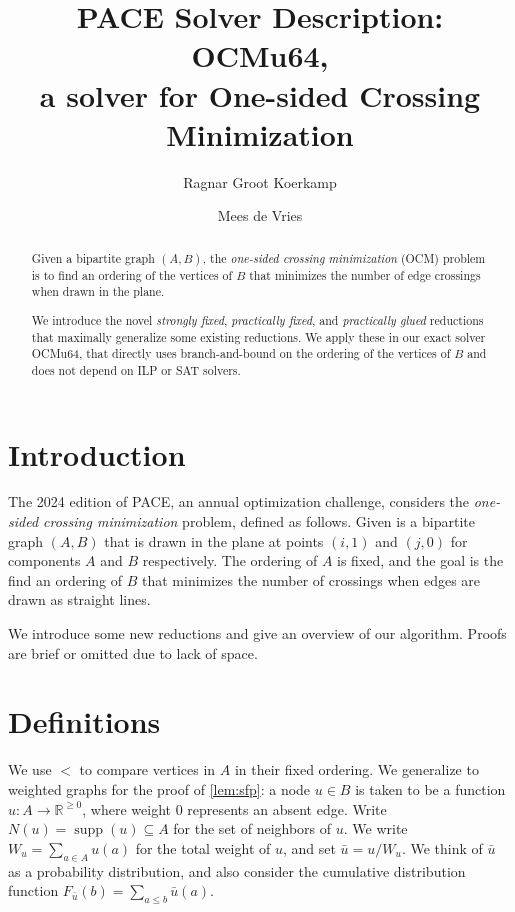 \documentclass[a4paper,UKenglish,cleveref, autoref, thm-restate]{lipics-v2021}
\title{PACE Solver Description: OCMu64,\\ a solver for One-sided Crossing Minimization} %
\author{Ragnar {Groot Koerkamp}}{ETH Zurich, Switzerland}{ragnar.grootkoerkamp@gmail.com}{https://orcid.org/0000-0002-2091-1237}{}%
\author{Mees de Vries}{Unaffiliated, The Netherlands}{meesdevries@protonmail.com}{}{}
\DeclareMathOperator{\supp}{supp}
\begin{document}
\maketitle

\begin{abstract}
  Given a bipartite graph $(A,B)$, the \emph{one-sided crossing minimization}
  (OCM) problem is to find an ordering of the vertices of $B$ that minimizes the
  number of edge crossings when drawn in the plane.

  We introduce the novel \emph{strongly fixed}, \emph{practically fixed}, and
  \emph{practically glued} reductions that maximally generalize some existing
  reductions.
  We apply these in our exact solver OCMu64, that directly uses branch-and-bound
  on the ordering of the vertices of $B$ and does not depend on ILP or SAT
  solvers.
\end{abstract}

\section{Introduction}

The 2024 edition of PACE, an annual optimization challenge, considers the
\emph{one-sided crossing minimization} problem, defined as follows.
Given is a bipartite graph $(A, B)$ that is drawn in the plane at points
$(i, 1)$ and $(j,0)$ for components $A$ and $B$ respectively. The ordering of $A$
is fixed, and the goal is the find an ordering of $B$ that minimizes the number of
crossings when edges are drawn as straight lines.

We introduce some new reductions and give an overview of our algorithm. Proofs are brief or
omitted due to lack of space.

\section{Definitions}
We use $<$ to compare vertices in $A$ in their fixed ordering. We generalize to weighted graphs
for the proof of \cref{lem:sfp}: a node $u \in B$ is taken to be a function $u: A \to \mathbb
R^{\geq 0}$, where weight 0 represents an absent edge. Write $N(u) = \supp(u) \subseteq A$ for the
set of neighbors of $u$. We write $W_u = \sum_{a \in A}u(a)$ for the total weight of $u$, and
set $\bar u = u/W_u$. We think of $\bar u$ as a probability distribution, and also consider the
cumulative distribution function $F_{\bar u}(b) = \sum_{a \leq b} \bar u(a)$.
\end{document}
